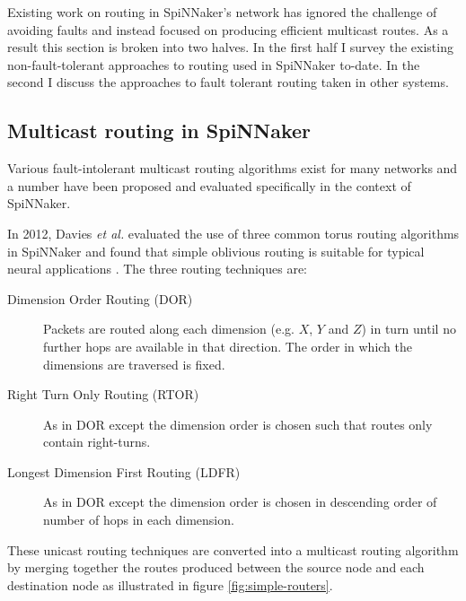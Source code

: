 		Existing work on routing in SpiNNaker's network has ignored the challenge
		of avoiding faults and instead focused on producing efficient multicast
		routes. As a result this section is broken into two halves. In the first
		half I survey the existing non-fault-tolerant approaches to routing used in
		SpiNNaker to-date. In the second I discuss the approaches to fault tolerant
		routing taken in other systems.
		
		\subsection{Multicast routing in SpiNNaker}
			
			Various fault-intolerant multicast routing algorithms exist for many
			networks and a number have been proposed and evaluated specifically in the
			context of SpiNNaker.
			
			In 2012, Davies \emph{et al.} evaluated the use of three common torus
			routing algorithms in SpiNNaker and found that simple oblivious routing is
			suitable for typical neural applications \cite{davies12}. The three
			routing techniques are:
			
			\begin{description}
				
				\item[Dimension Order Routing (DOR)] Packets are routed along each
				dimension (e.g. $X$, $Y$ and $Z$) in turn until no further hops are
				available in that direction.  The order in which the dimensions are
				traversed is fixed.
				
				\item[Right Turn Only Routing (RTOR)] As in DOR except the dimension
				order is chosen such that routes only contain right-turns.
				
				\item[Longest Dimension First Routing (LDFR)] As in DOR except the
				dimension order is chosen in descending order of number of hops in each
				dimension.
				
			\end{description}
			
			These unicast routing techniques are converted into a multicast routing
			algorithm by merging together the routes produced between the source node
			and each destination node as illustrated in figure
			\ref{fig:simple-routers}.
			
